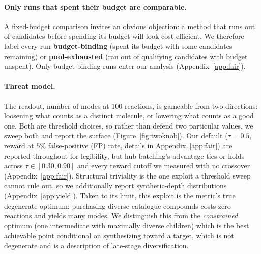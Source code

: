 \documentclass{article}
\newcommand{\checkval}[1]{\textcolor{blue}{#1}}
\begin{document}
\paragraph{Only runs that spent their budget are comparable.}
A fixed-budget comparison invites an obvious objection: a method that runs out of candidates before spending its budget will look cost efficient. We therefore label every run \textbf{budget-binding} (spent its budget with some candidates remaining) or \textbf{pool-exhausted} (ran out of qualifying candidates with budget unspent). Only budget-binding runs enter our analysis (Appendix~\ref{app:fair}).


\paragraph{Threat model.}
\label{sec:threat}
The readout, number of modes at 100 reactions, is gameable from two directions: loosening what counts as a distinct molecule, or lowering what counts as a good one. Both are threshold choices, so rather than defend two particular values, we sweep both and report the surface (Figure~\ref{fig:twoknob}). Our default ($\tau=0.5$, reward at $5\%$ false-positive (FP) rate, details in Appendix~\ref{app:fair}) are reported throughout for legibility, but hub-batching's advantage ties or holds across $\tau\in[0.30,0.90]$ and every reward cutoff we measured with no crossover (Appendix~\ref{app:fair}). Structural triviality is the one exploit a threshold sweep cannot rule out, so we additionally report synthetic-depth distributions (Appendix~\ref{app:yield}). Taken to its limit, this exploit is the metric's true degenerate optimum: purchasing diverse catalogue compounds costs zero reactions and yields many modes. We distinguish this from the \emph{constrained} optimum (one intermediate with maximally diverse children) which is the best achievable point conditional on synthesizing toward a target, which is not degenerate and is a description of late-stage diversification.
\end{document}
